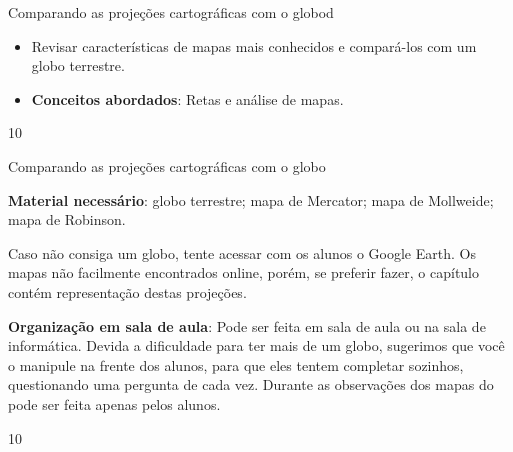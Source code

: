 \begin{ObjetivoEsp}{Comparando as projeções cartográficas com o globod}
{
 \begin{itemize}
  \item Revisar características de mapas mais conhecidos e compará-los com um globo terrestre.
  \item \textbf{Conceitos abordados}: Retas e análise de mapas.
  \end{itemize} 
}{1}{0}
\end{ObjetivoEsp}
\begin{Recomenda}{Comparando as projeções cartográficas com o globo}
{
  \textbf{Material necessário}: globo terrestre; mapa de Mercator; mapa de Mollweide; mapa de Robinson.

  Caso não consiga um globo, tente acessar com os alunos o Google Earth. Os mapas não facilmente encontrados online, porém, se preferir fazer, o capítulo contém representação destas projeções.

  \textbf{Organização em sala de aula}: Pode ser feita em sala de aula ou na sala de informática. Devida a dificuldade para ter mais de um globo, sugerimos que você o manipule na frente dos alunos, para que eles tentem completar sozinhos, questionando uma pergunta de cada vez. Durante as observações dos mapas do pode ser feita apenas pelos alunos.
}
{1}{0}
\end{Recomenda}
